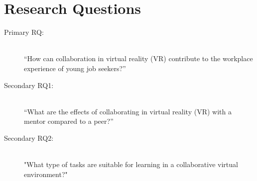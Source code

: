 \section{Research Questions}
\label{RQ}
\begin{description}
    \item [Primary RQ:]\hfill \\
    “How can collaboration in virtual reality (VR) contribute to the workplace experience of young job seekers?” 
    \item [Secondary RQ1:]\hfill \\
    “What are the effects of collaborating in virtual reality (VR) with a mentor compared to a peer?”
    \item [Secondary RQ2:]\hfill \\
    "What type of tasks are suitable for learning in a collaborative virtual environment?"
\end{description}


\cleardoublepage

